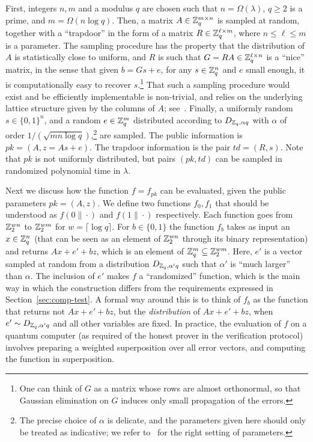 First, integers $n,m$ and a modulus $q$ are chosen such that $n= \Omega(\lambda)$, $q\geq 2$ is a prime, and $m=\Omega(n\log q)$. Then, a matrix $A\in\mathbb{Z}_q^{m\times n}$ is sampled at random, together with a ``trapdoor'' in the form of a matrix $R\in \mathbb{Z}_q^{\ell\times m}$, where $n\leq \ell\leq m$ is a parameter. The sampling procedure has the property that the distribution of $A$ is statistically close to uniform, and $R$ is such that $G = RA \in \mathbb{Z}_q^{\ell\times n}$ is a ``nice'' matrix, in the sense that given $b=Gs+e$, for any $s\in\mathbb{Z}_q^n$ and $e$ small enough, it is computationally easy to recover $s$.\footnote{One can think of $G$ as a matrix whose rows are almost orthonormal, so that Gaussian elimination on $G$ induces only small propagation of the errors.} That such a sampling procedure would exist and be efficiently implementable is non-trivial, and relies on the underlying lattice structure given by the columns of $A$; see~\cite{micciancio2012trapdoors}.
Finally, a uniformly random $s\in\{0,1\}^n$, and a random $e\in \mathbb{Z}_q^m$ distributed according to $D_{\mathbb{Z}_q,\alpha q}$ with $\alpha$ of order $1/(\sqrt{mn\log q})$,\footnote{The precise choice of $\alpha$ is delicate, and the parameters given here should only be treated as indicative; we refer to~\cite[Section 8]{brakerski2018cryptographic} for the right setting of parameters.} are sampled. The public information is $pk=(A,z=As+e)$. The trapdoor information is the pair $td=(R,s)$. Note that $pk$ is not uniformly distributed, but pairs $(pk,td)$ can be sampled in randomized polynomial time in $\lambda$. 

Next we discuss how the function $f=f_{pk}$ can be evaluated, given the public parameters $pk=(A,z)$. We define two functions $f_0,f_1$ that should be understood as $f(0\|\cdot)$ and $f(1\|\cdot)$ respectively. Each function goes from $\mathbb{Z}_2^{wn}$ to $\mathbb{Z}_2^{wm}$ for $w=\lceil \log q \rceil$. For $b\in\{0,1\}$ the function $f_b$ takes as input an $x\in\mathbb{Z}_q^n$ (that can be seen as an element of $\mathbb{Z}_2^{wn}$ through its binary representation) and returns $Ax+e'+b z$, which is an element of $\mathbb{Z}_q^m \subseteq \mathbb{Z}_2^{wm}$. Here, $e'$ is a vector sampled at random from a distribution $D_{\mathbb{Z}_q,\alpha'q}$ such that $\alpha'$ is ``much larger'' than $\alpha$. The inclusion of $e'$ makes $f$ a ``randomized'' function, which is the main way in which the construction differs from the requirements expressed in Section~\ref{sec:comp-test}. A formal way around this is to think of $f_b$ as the function that returns not $Ax+e'+bz$, but the \emph{distribution} of $Ax+e'+bz$, when $e'\sim D_{\mathbb{Z}_q,\alpha'q}$ and all other variables are fixed. In practice, the evaluation of $f$ on a quantum computer (as required of the honest prover in the verification protocol) involves preparing a weighted superposition over all error vectors, and computing the function in superposition. 

